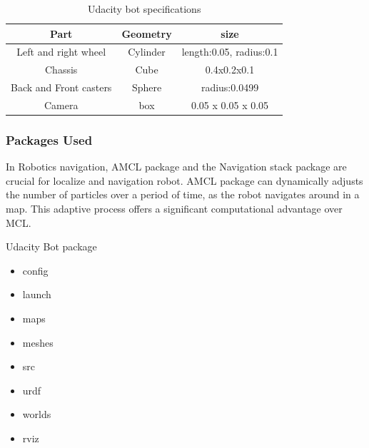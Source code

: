 \documentclass[10pt,journal,compsoc]{IEEEtran}
\begin{document}
\begin{table}[h]
 \begin{center}
      \begin{tabular}{ |c|c|c| } 
       \hline
       Part & Geometry & size \\
       \hline
       Left and right wheel & Cylinder & length:0.05, radius:0.1 \\
       Chassis & Cube & 0.4x0.2x0.1  \\ 
       Back and Front casters & Sphere & radius:0.0499 \\
       Camera & box & 0.05 x 0.05 x 0.05 \\
       \hline
      \end{tabular}
      \caption{Udacity bot specifications}
      \label{table:1}
      \end{center}
      \end{table}
\subsubsection{Packages Used}
In Robotics navigation, AMCL package and the Navigation stack package are crucial for localize and navigation robot. AMCL package can dynamically adjusts the number of particles over a period of time, as the robot navigates around in a map. This adaptive process offers a significant computational advantage over MCL.  

Udacity Bot package
\begin{itemize}
\item config
\item launch
\item maps
\item meshes
\item src
\item urdf
\item worlds
\item rviz
\end {itemize}
\end{document}

